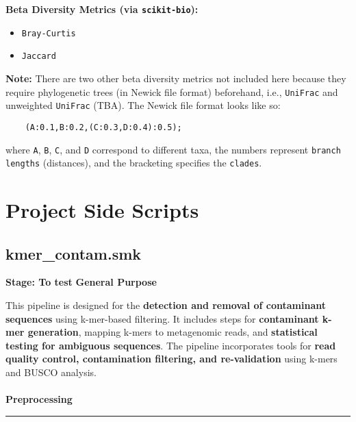 \documentclass[11pt]{report}
\begin{document}
{\begin{multicols}{2}
	\textbf{Beta Diversity Metrics (via \texttt{scikit-bio}):}
	\begin{itemize}
		\item \texttt{Bray-Curtis}
		\item \texttt{Jaccard} 
	\end{itemize}
\end{multicols}

\textbf{Note:} There are two other beta diversity metrics not included here because they require phylogenetic trees (in Newick file format) beforehand, i.e., \texttt{UniFrac} and unweighted \texttt{UniFrac} (TBA). The Newick file format looks like so:
\begin{verbatim}
	(A:0.1,B:0.2,(C:0.3,D:0.4):0.5);
\end{verbatim}
where \texttt{A}, \texttt{B}, \texttt{C}, and \texttt{D} correspond to different taxa, the numbers represent \texttt{branch lengths} (distances), and the bracketing specifies the \texttt{clades}.






\newpage

\pagestyle{fancy}
\fancyhf{}
\fancyhead[C]{\leftmark}  %
\fancyhead[R]{\thepage}

\setcounter{section}{0}
\setcounter{subsection}{0}

\linenumbers*



\chapter{Project Side Scripts}
\section{kmer\_contam.smk}
\textbf{Stage: To test}
\textbf{General Purpose}

This pipeline is designed for the \textbf{detection and removal of contaminant sequences} using k-mer-based filtering. It includes steps for \textbf{contaminant k-mer generation}, mapping k-mers to metagenomic reads, and \textbf{statistical testing for ambiguous sequences}. The pipeline incorporates tools for \textbf{read quality control, contamination filtering, and re-validation} using k-mers and BUSCO analysis.
\\
\\ \textbf{Preprocessing} \\ \rule{\linewidth}{0.5mm} 

}
\end{document}
